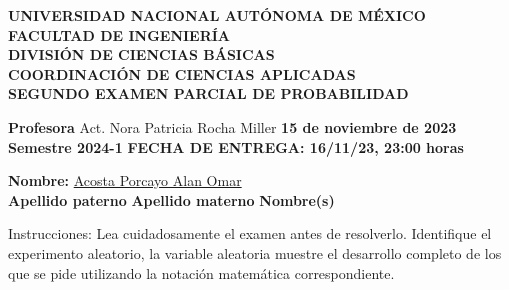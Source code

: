 \documentclass[12pt]{report}
\newcommand{\linejump}{\hfill \break}
\begin{document}
  \noindent
  \begin{center}
    \textbf{UNIVERSIDAD NACIONAL AUTÓNOMA DE MÉXICO \\
    FACULTAD DE INGENIERÍA \\
    DIVISIÓN DE CIENCIAS BÁSICAS \\
    COORDINACIÓN DE CIENCIAS APLICADAS \\
    SEGUNDO EXAMEN PARCIAL DE PROBABILIDAD}
  \end{center}

  \linejump

  \textbf{Profesora} Act. Nora Patricia Rocha Miller \hfill \textbf{15 de noviembre de 2023} \\
  \textbf{Semestre 2024-1} \hfill \textbf{FECHA DE ENTREGA: 16/11/23, 23:00 horas}

  \linejump

  \textbf{Nombre:} \underline{\hspace*{2.8cm} Acosta \hspace*{2.8cm} Porcayo \hspace*{2.8cm} Alan Omar \hspace*{2.8cm}}  \\
  \hspace*{3.7cm} \textbf{Apellido paterno} \hspace*{0.75cm} \textbf{Apellido materno} \hspace*{1.8cm} \textbf{Nombre(s)}

  \linejump

  {\color{azuloscuro} Instrucciones: Lea cuidadosamente el examen antes de resolverlo. Identifique el experimento aleatorio, la variable aleatoria muestre el desarrollo completo de los que se pide utilizando la notación matemática correspondiente.}

  \linejump
  \linejump
\end{document}
